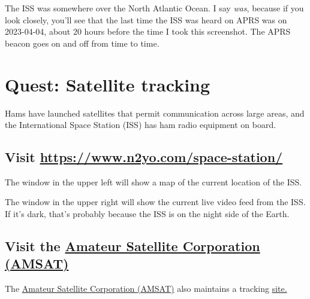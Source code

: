 \documentclass[
  letterpaper,
  DIV=11,
  numbers=noendperiod]{scrreport}
\begin{document}
The ISS was somewhere over the North Atlantic Ocean. I say \emph{was},
because if you look closely, you'll see that the last time the ISS was
heard on APRS was on 2023-04-04, about 20 hours before the time I took
this screenshot. The APRS beacon goes on and off from time to time.

\hypertarget{quest-sattelites}{%
\chapter*{Quest: Satellite tracking}\label{quest-sattelites}}


Hams have launched satellites that permit communication across large
areas, and the International Space Station (ISS) has ham radio equipment
on board.

\hypertarget{visit-httpswww.n2yo.comspace-station}{%
\section*{\texorpdfstring{Visit
\url{https://www.n2yo.com/space-station/}}{Visit https://www.n2yo.com/space-station/}}\label{visit-httpswww.n2yo.comspace-station}}


The window in the upper left will show a map of the current location of
the ISS.

The window in the upper right will show the current live video feed from
the ISS. If it's dark, that's probably because the ISS is on the night
side of the Earth.

\hypertarget{visit-the-amateur-satellite-corporation-amsat}{%
\section*{\texorpdfstring{Visit the
\href{https://www.amsat.org/}{Amateur Satellite Corporation
(AMSAT)}}{Visit the Amateur Satellite Corporation (AMSAT)}}\label{visit-the-amateur-satellite-corporation-amsat}}


The \href{https://www.amsat.org/}{Amateur Satellite Corporation (AMSAT)}
also maintains a tracking \href{https://www.amsat.org/track/}{site.}
\end{document}
